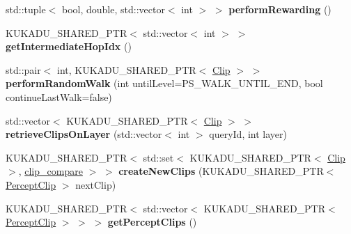 \begin{DoxyCompactItemize}
\item 
std\+::tuple$<$ bool, double, std\+::vector$<$ int $>$ $>$ {\bfseries perform\+Rewarding} ()\hypertarget{classkukadu_1_1ProjectiveSimulator_ad27a256005f9bbd8648fc95e874a8326}{}\label{classkukadu_1_1ProjectiveSimulator_ad27a256005f9bbd8648fc95e874a8326}

\item 
K\+U\+K\+A\+D\+U\+\_\+\+S\+H\+A\+R\+E\+D\+\_\+\+P\+TR$<$ std\+::vector$<$ int $>$ $>$ {\bfseries get\+Intermediate\+Hop\+Idx} ()\hypertarget{classkukadu_1_1ProjectiveSimulator_a243c3f0fd4eb0ccf9550f7a0e1f156ba}{}\label{classkukadu_1_1ProjectiveSimulator_a243c3f0fd4eb0ccf9550f7a0e1f156ba}

\item 
std\+::pair$<$ int, K\+U\+K\+A\+D\+U\+\_\+\+S\+H\+A\+R\+E\+D\+\_\+\+P\+TR$<$ \hyperlink{classkukadu_1_1Clip}{Clip} $>$ $>$ {\bfseries perform\+Random\+Walk} (int until\+Level=P\+S\+\_\+\+W\+A\+L\+K\+\_\+\+U\+N\+T\+I\+L\+\_\+\+E\+ND, bool continue\+Last\+Walk=false)\hypertarget{classkukadu_1_1ProjectiveSimulator_ad914042887aecd7daec22ce86618b4b9}{}\label{classkukadu_1_1ProjectiveSimulator_ad914042887aecd7daec22ce86618b4b9}

\item 
std\+::vector$<$ K\+U\+K\+A\+D\+U\+\_\+\+S\+H\+A\+R\+E\+D\+\_\+\+P\+TR$<$ \hyperlink{classkukadu_1_1Clip}{Clip} $>$ $>$ {\bfseries retrieve\+Clips\+On\+Layer} (std\+::vector$<$ int $>$ query\+Id, int layer)\hypertarget{classkukadu_1_1ProjectiveSimulator_a4b05eb50a4d1e67a8b8d2efb66101c4b}{}\label{classkukadu_1_1ProjectiveSimulator_a4b05eb50a4d1e67a8b8d2efb66101c4b}

\item 
K\+U\+K\+A\+D\+U\+\_\+\+S\+H\+A\+R\+E\+D\+\_\+\+P\+TR$<$ std\+::set$<$ K\+U\+K\+A\+D\+U\+\_\+\+S\+H\+A\+R\+E\+D\+\_\+\+P\+TR$<$ \hyperlink{classkukadu_1_1Clip}{Clip} $>$, \hyperlink{structkukadu_1_1clip__compare}{clip\+\_\+compare} $>$ $>$ {\bfseries create\+New\+Clips} (K\+U\+K\+A\+D\+U\+\_\+\+S\+H\+A\+R\+E\+D\+\_\+\+P\+TR$<$ \hyperlink{classkukadu_1_1PerceptClip}{Percept\+Clip} $>$ next\+Clip)\hypertarget{classkukadu_1_1ProjectiveSimulator_a4a89d7e3be9a430d2d9408ea45b118fd}{}\label{classkukadu_1_1ProjectiveSimulator_a4a89d7e3be9a430d2d9408ea45b118fd}

\item 
K\+U\+K\+A\+D\+U\+\_\+\+S\+H\+A\+R\+E\+D\+\_\+\+P\+TR$<$ std\+::vector$<$ K\+U\+K\+A\+D\+U\+\_\+\+S\+H\+A\+R\+E\+D\+\_\+\+P\+TR$<$ \hyperlink{classkukadu_1_1PerceptClip}{Percept\+Clip} $>$ $>$ $>$ {\bfseries get\+Percept\+Clips} ()\hypertarget{classkukadu_1_1ProjectiveSimulator_a9ef2a9e013f08283106eda01a99d71c3}{}\label{classkukadu_1_1ProjectiveSimulator_a9ef2a9e013f08283106eda01a99d71c3}


\end{DoxyCompactItemize}
